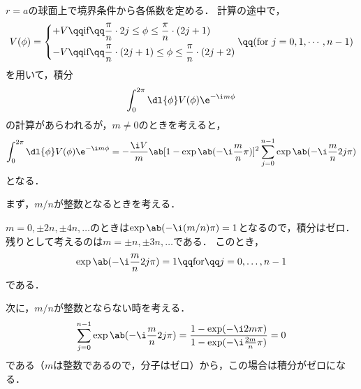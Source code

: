 \begin{enumerate}[%
  label=%
  \fbox{%
   {\thesection.\arabic*}%
    },%
    leftmargin=3\parindent]
\begin{enumerate}[(a)]
\begin{gather}
        \end{gather}
        $r=a$の球面上で境界条件から各係数を定める．
        計算の途中で，
        \begin{gather}
          V(\phi) = \left\{
            \begin{aligned}
              +V &\qq \text{if}\qq \frac{\pi}{n}\cdot 2j \leq \phi \leq \frac{\pi}{n}\cdot(2j+1)\\
              -V &\qq \text{if}\qq \frac{\pi}{n}\cdot (2j+1) \leq \phi \leq \frac{\pi}{n}\cdot(2j+2)\\
            \end{aligned}
          \right. \qq (\text{for}\ j = 0, 1, \cdots, n-1)
        \end{gather}
        を用いて，積分
        \begin{gather}
          \int_0^{2\pi} \dl{\phi} V(\phi) \e^{-\i m\phi}
        \end{gather}
        の計算があらわれるが，$m \neq 0$のときを考えると，
        \begin{gather}
          \int_0^{2\pi} \dl{\phi} V(\phi) \e^{-\i m\phi} = -\frac{\i V}{m}\ab[1 - \exp\ab(-\i \frac{m}{n}\pi)]^2 \sum_{j=0}^{n-1} \exp\ab(-\i\frac{m}{n}2j\pi)
        \end{gather}
        となる．

        まず，$m / n$が整数となるときを考える．

        $m = 0, \pm 2n, \pm 4n, \ldots$のときは$\exp\ab(-\i(m/n)\pi) = 1$となるので，積分はゼロ．
        残りとして考えるのは$m = \pm n, \pm 3n, \ldots$である．
        このとき，
        \begin{gather}
          \exp\ab(-\i \frac{m}{n}2j \pi) = 1 \qq \text{for}\qq j = 0, \ldots, n-1
        \end{gather}
        である．

        次に，$m / n$が整数とならない時を考える．
        \begin{gather}
          \sum_{j=0}^{n-1} \exp\ab(-\i \frac{m}{n}2j\pi) = \frac{1 - \exp(-\i 2m\pi)}{1 - \exp(-\i \frac{2m}{n}\pi)} = 0
        \end{gather}
        である（$m$は整数であるので，分子はゼロ）から，この場合は積分がゼロになる．


\end{enumerate}
\end{enumerate}
